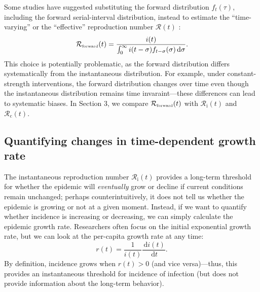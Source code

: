 \documentclass[12pt]{article}
\newcommand{\comment}{\showcomment}
\newcommand{\showcomment}[3]{\textcolor{#1}{\textbf{[#2: }\textsl{#3}\textbf{]}}}
\newcommand{\jd}[1]{\comment{cyan}{JD}{#1}}
\newcommand{\eref}[1]{Eq.~\ref{eq:#1}}
\newcommand{\Rx}[1]{\ensuremath{{\mathcal R}_{#1}}\xspace}
\newcommand{\Rc}{\Rx{\mathrm{c}}}
\newcommand{\Ri}{\Rx{\mathrm{i}}}
\newcommand{\RR}{\ensuremath{{\mathcal R}}\xspace}
\newcommand{\tsub}[2]{#1_{{\textrm{\tiny #2}}}}
\newcommand{\dd}[1]{\ensuremath{\, \mathrm{d}#1}}
\newcommand{\dsigma}{\dd{\sigma}}
\begin{document}

Some studies have suggested substituting the forward distribution $f_t(\tau)$, including the forward serial-interval distribution, instead to estimate the ``time-varying'' or the ``effective'' reproduction number $\RR(t)$ \citep{liu2018measurability, ali2020serial}:
\begin{equation}
\tsub{\RR}{forward}(t) = \frac{i(t)}{\int_0^\infty i(t-\sigma) f_{t-\sigma}(\sigma) \dsigma}.
\end{equation}
This choice is potentially problematic, as the forward distribution differs systematically from the instantaneous distribution.
For example, under constant-strength interventions, the forward distribution changes over time even though the instantaneous distribution remains time invaraint---these differences can lead to systematic biases.
In Section 3, we compare $\tsub{\RR}{forward}(t)$ with $\Ri(t)$ and $\Rc(t)$.

\subsection{Quantifying changes in time-dependent growth rate}

The instantaneous reproduction number $\Ri(t)$ provides a long-term threshold for whether the epidemic will \emph{eventually} grow or decline if current conditions remain unchanged;
perhaps counterintuitively, it does not tell us whether the epidemic is growing or not at a given moment.
Instead, if we want to quantify whether incidence is increasing or decreasing, we can simply calculate the epidemic growth rate.
Researchers often focus on the initial exponential growth rate, but we can look at the per-capita growth rate at any time:
\begin{equation}
r(t) = \frac{1}{i(t)} \frac{\dd{i(t)}}{\dd{t}}.
\end{equation}
By definition, incidence grows when $r(t) > 0$ (and vice versa)---thus, this provides an instantaneous threshold for incidence of infection (but does not provide information about the long-term behavior).
\end{document}
